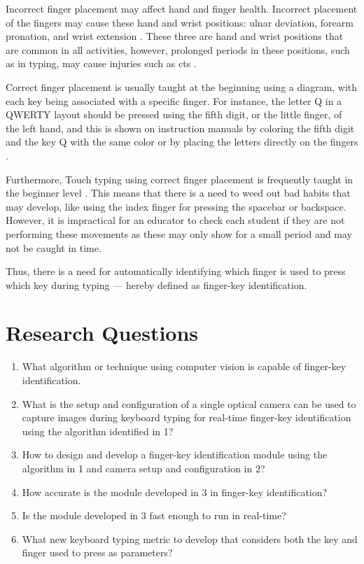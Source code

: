 \documentclass{report}
\begin{document}
Incorrect finger placement may affect hand and finger health. Incorrect
placement of the fingers may cause these hand and wrist positions: ulnar
deviation, forearm pronation, and wrist extension \parencite{serina1999}. These
three are hand and wrist positions that are common in all activities, however,
prolonged periods in these positions, such as in typing, may cause injuries such
as \ac{cts} \parencite{toosi2015}.

Correct finger placement is usually taught at the beginning using a diagram,
with each key being associated with a specific finger. For instance, the letter
Q in a QWERTY layout should be pressed using the fifth digit, or the little
finger, of the left hand, and this is shown on instruction manuals by coloring
the fifth digit and the key Q with the same color or by placing the letters
directly on the fingers \parencite{dobson2009touch}.

Furthermore, Touch typing using correct finger placement is frequently taught in
the beginner level \parencite{donica2018}. This means that there is a need to
weed out bad habits that may develop, like using the index finger for pressing
the spacebar or backspace. However, it is impractical for an educator to check
each student if they are not performing these movements as these may only show
for a small period and may not be caught in time.

Thus, there is a need for automatically identifying which finger is used to
press which key during typing --- hereby defined as finger-key identification.

\section{Research Questions}
\begin{enumerate}
	\item What algorithm or technique using computer vision is capable of
	      finger-key identification.
	\item What is the setup and configuration of a single optical camera can be
	      used to capture images during keyboard typing for real-time finger-key
	      identification using the algorithm identified in 1?
	\item How to design and develop a finger-key identification module using
	      the algorithm in 1 and camera setup and configuration in 2?
	\item How accurate is the module developed in 3 in finger-key identification?
	\item Is the module developed in 3 fast enough to run in real-time?
	\item What new keyboard typing metric to develop that considers both the key and
	      finger used to press as parameters?
\end{enumerate}
\end{document}
